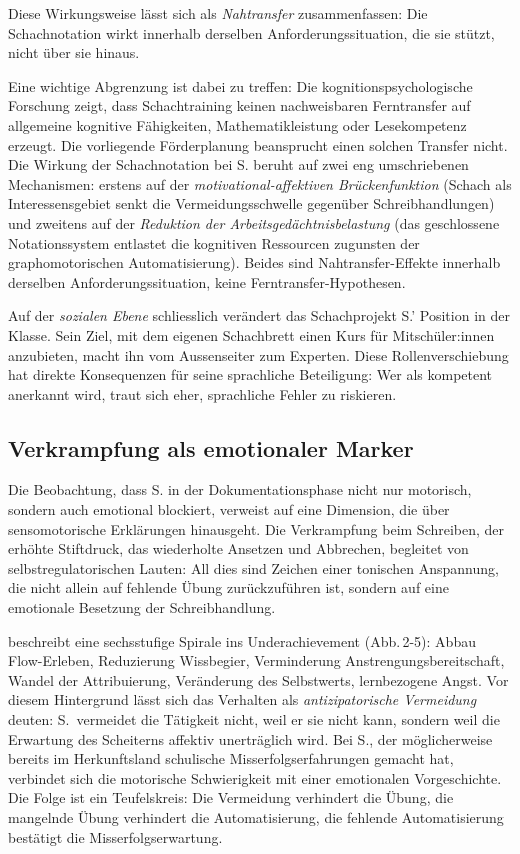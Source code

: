\documentclass[ngerman, a4paper]{article}
\begin{document}
Diese Wirkungsweise lässt sich als \textit{Nahtransfer} zusammenfassen:
Die Schachnotation wirkt innerhalb derselben Anforderungssituation, die
sie stützt, nicht über sie hinaus.

Eine wichtige Abgrenzung ist dabei zu treffen: Die kognitionspsychologische
Forschung zeigt, dass Schachtraining keinen nachweisbaren Ferntransfer
auf allgemeine kognitive Fähigkeiten, Mathematikleistung oder
Lesekompetenz erzeugt. Die vorliegende Förderplanung beansprucht
einen solchen Transfer nicht. Die Wirkung der Schachnotation bei S.
beruht auf zwei eng umschriebenen Mechanismen: erstens auf der
\textit{motivational-affektiven Brückenfunktion} (Schach als
Interessensgebiet senkt die Vermeidungsschwelle gegenüber
Schreibhandlungen) und zweitens auf der \textit{Reduktion der
Arbeitsgedächtnisbelastung} (das geschlossene Notationssystem entlastet
die kognitiven Ressourcen zugunsten der graphomotorischen Automatisierung).
Beides sind Nahtransfer-Effekte innerhalb derselben Anforderungssituation,
keine Ferntransfer-Hypothesen.

Auf der \textit{sozialen Ebene} schliesslich verändert das Schachprojekt S.' Position
in der Klasse. Sein Ziel, mit dem eigenen Schachbrett einen Kurs für Mitschüler:innen
anzubieten, macht ihn vom Aussenseiter zum Experten. Diese Rollenverschiebung hat
direkte Konsequenzen für seine sprachliche Beteiligung: Wer als kompetent anerkannt
wird, traut sich eher, sprachliche Fehler zu riskieren.

\subsection{Verkrampfung als emotionaler Marker}

Die Beobachtung, dass S. in der Dokumentationsphase nicht nur motorisch, sondern
auch emotional blockiert, verweist auf eine Dimension, die über sensomotorische
Erklärungen hinausgeht. Die Verkrampfung beim Schreiben, der erhöhte Stiftdruck,
das wiederholte Ansetzen und Abbrechen, begleitet von selbstregulatorischen Lauten:
All dies sind Zeichen einer tonischen Anspannung, die nicht allein auf fehlende
Übung zurückzuführen ist, sondern auf eine emotionale Besetzung der Schreibhandlung.

\textcite[S.\,70--72]{lehwald2017motivation} beschreibt eine sechsstufige
Spirale ins Underachievement (Abb.\,2-5): Abbau Flow-Erleben, Reduzierung
Wissbegier, Verminderung Anstrengungsbereitschaft, Wandel der Attribuierung,
Veränderung des Selbstwerts, lernbezogene Angst. Vor diesem Hintergrund
lässt sich das Verhalten als \textit{antizipatorische Vermeidung} deuten:
S.\ vermeidet die Tätigkeit nicht, weil er sie nicht kann, sondern weil
die Erwartung des Scheiterns affektiv unerträglich wird. Bei S., der
möglicherweise bereits im Herkunftsland schulische Misserfolgserfahrungen
gemacht hat, verbindet sich die motorische Schwierigkeit mit einer
emotionalen Vorgeschichte. Die Folge ist ein Teufelskreis: Die Vermeidung
verhindert die Übung, die mangelnde Übung verhindert die Automatisierung,
die fehlende Automatisierung bestätigt die Misserfolgserwartung.
\end{document}
